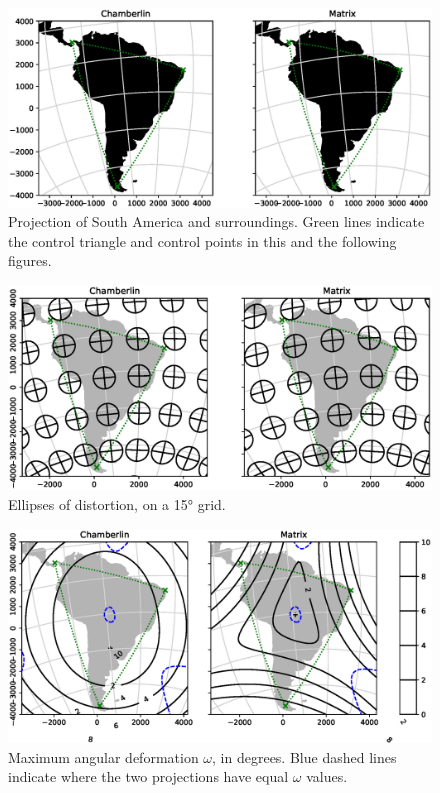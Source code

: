 \documentclass[]{interact}
\begin{document}
\begin{figure}
  \includegraphics[width=\textwidth]{SA_Wall_Map_zoom}
  \caption{Projection of South America and surroundings. Green lines indicate
  the control triangle and control points in this and the following figures.}
  \label{fig:proj}
\end{figure}

\begin{figure}
  \includegraphics[width=\textwidth]{SA_Wall_Map_tissot}
  \caption{Ellipses of distortion, on a 15° grid.}
  \label{fig:tissot}
\end{figure}

\begin{figure}
  \includegraphics[width=\textwidth]{SA_Wall_Map_omega}
  \caption{Maximum angular deformation $\omega$, in degrees. Blue dashed lines
  indicate where the two projections have equal $\omega$ values.}
  \label{fig:angle}
\end{figure}
\end{document}
